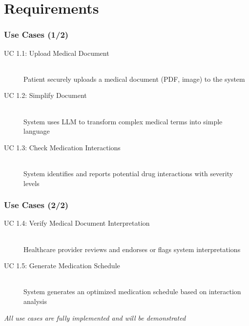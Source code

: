 \documentclass{beamer}
\begin{document}
\section{Requirements}
\begin{frame}
  \frametitle{Use Cases (1/2)}
  
  \begin{description}
    \item[\textcolor{rxgreen}{UC 1.1: Upload Medical Document}] \hfill \\
    Patient securely uploads a medical document (PDF, image) to the system
    
    \item[\textcolor{rxgreen}{UC 1.2: Simplify Document}] \hfill \\
    System uses LLM to transform complex medical terms into simple language
    
    \item[\textcolor{rxgreen}{UC 1.3: Check Medication Interactions}] \hfill \\
    System identifies and reports potential drug interactions with severity levels
  \end{description}
\end{frame}

\begin{frame}
  \frametitle{Use Cases (2/2)}
  
  \begin{description}
    \item[\textcolor{rxgreen}{UC 1.4: Verify Medical Document Interpretation}] \hfill \\
    Healthcare provider reviews and endorses or flags system interpretations
    
    \item[\textcolor{rxgreen}{UC 1.5: Generate Medication Schedule}] \hfill \\
    System generates an optimized medication schedule based on interaction analysis
  \end{description}
  
  \vspace{0.5cm}
  \begin{center}
    \textit{All use cases are fully implemented and will be demonstrated}
  \end{center}
\end{frame}
\end{document}
